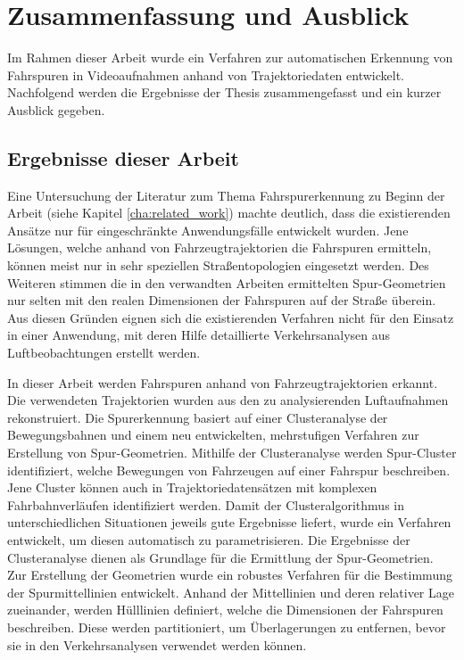 
\chapter{Zusammenfassung und Ausblick}
\label{cha:end}

Im Rahmen dieser Arbeit wurde ein Verfahren zur automatischen Erkennung von Fahrspuren in Videoaufnahmen
anhand von Trajektoriedaten entwickelt.
Nachfolgend werden die Ergebnisse der Thesis zusammengefasst und ein kurzer Ausblick gegeben.

\section{Ergebnisse dieser Arbeit}

Eine Untersuchung der Literatur zum Thema Fahrspurerkennung zu Beginn der Arbeit
(siehe Kapitel \ref{cha:related_work}) machte deutlich, dass die existierenden Ansätze 
nur für eingeschränkte Anwendungsfälle entwickelt wurden. 
Jene Lösungen, welche anhand von Fahrzeugtrajektorien die Fahrspuren ermitteln, können meist nur
in sehr speziellen Straßentopologien eingesetzt werden.
Des Weiteren stimmen die in den verwandten Arbeiten ermittelten Spur-Geometrien nur selten mit den
realen Dimensionen der Fahrspuren auf der Straße überein.
Aus diesen Gründen eignen sich die existierenden Verfahren nicht für den Einsatz in einer
Anwendung, mit deren Hilfe detaillierte Verkehrsanalysen aus Luftbeobachtungen erstellt werden.

In dieser Arbeit werden Fahrspuren anhand von Fahrzeugtrajektorien erkannt. Die verwendeten Trajektorien
wurden aus den zu analysierenden Luftaufnahmen rekonstruiert.
Die Spurerkennung basiert auf einer Clusteranalyse der Bewegungsbahnen
und einem neu entwickelten, mehrstufigen Verfahren zur Erstellung von Spur-Geometrien.
Mithilfe der Clusteranalyse werden Spur-Cluster identifiziert, welche Bewegungen von Fahrzeugen auf einer Fahrspur beschreiben.
Jene Cluster können auch in Trajektoriedatensätzen mit komplexen Fahrbahnverläufen identifiziert werden.
Damit der Clusteralgorithmus in unterschiedlichen Situationen jeweils gute Ergebnisse liefert, wurde ein Verfahren
entwickelt, um diesen automatisch zu parametrisieren. 
Die Ergebnisse der Clusteranalyse dienen als Grundlage für die Ermittlung der Spur-Geometrien.
Zur Erstellung der Geometrien wurde ein robustes Verfahren für die Bestimmung der Spurmittellinien entwickelt.
Anhand der Mittellinien und deren relativer Lage zueinander, werden Hülllinien definiert,
welche die Dimensionen der Fahrspuren beschreiben. Diese werden partitioniert,
um Überlagerungen zu entfernen, bevor sie in den Verkehrsanalysen verwendet werden können.

